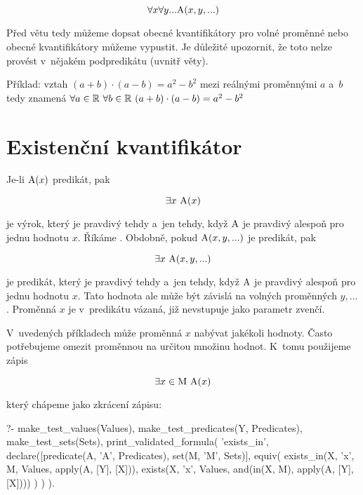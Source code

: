 \begin{equation}
\forall x \forall y ... \mathrm{A}(x, y, ...)
\end{equation}

Před větu tedy můžeme dopsat obecné kvantifikátory pro volné proměnné nebo  obecné kvantifikátory můžeme vypustit. Je důležité upozornit, že toto nelze provést v~nějakém podpredikátu (uvnitř věty).

Příklad: vztah \((a + b) \cdot (a - b) = a^2 - b^2\) mezi reálnými proměnnými \(a\) a~\(b\) tedy znamená \(\forall a \in \mathbb{R} \ \forall b \in \mathbb{R} \ (a + b) \cdot (a - b) = a^2 - b^2\)

\section{Existenční kvantifikátor}

Je-li \(\mathrm{A}(x)\) predikát, pak

\begin{equation}
\exists x \ \predicate{A}(x)
\end{equation}

je výrok, který je pravdivý tehdy a~jen tehdy, když \(\mathrm{A}\) je pravdivý alespoň pro jednu hodnotu \(x\). Říkáme . Obdobně, pokud \(\mathrm{A}(x, y, ...)\) je predikát, pak

\begin{equation}
\exists x \ \mathrm{A}(x, y, ...)
\end{equation}

je predikát, který je pravdivý tehdy a~jen tehdy, když \(\mathrm{A}\) je pravdivý alespoň pro jednu hodnotu \(x\). Tato hodnota ale může být závislá na volných proměnných \(y, ...\). Proměnná \(x\) je v~predikátu vázaná, již nevstupuje jako parametr zvenčí.

V~uvedených příkladech může proměnná \(x\) nabývat jakékoli hodnoty. Často potřebujeme omezit proměnnou na určitou množinu hodnot. K~tomu použijeme zápis

\begin{equation}
\exists x \in \mathrm{M} \ \predicate{A}(x)
\end{equation}

který chápeme jako zkrácení zápisu:

\begin{prolog}
?- 	make_test_values(Values),
	make_test_predicates(Y, Predicates),
	make_test_sets(Sets),
	print_validated_formula(
		'exists_in',
		declare([predicate(A, 'A', Predicates), set(M, 'M', Sets)],
			equiv(
				exists_in(X, 'x', M, Values, apply(A, [Y], [X])),
				exists(X, 'x', Values, and(in(X, M), apply(A, [Y], [X])))
			)
		)
	).
\end{prolog}

